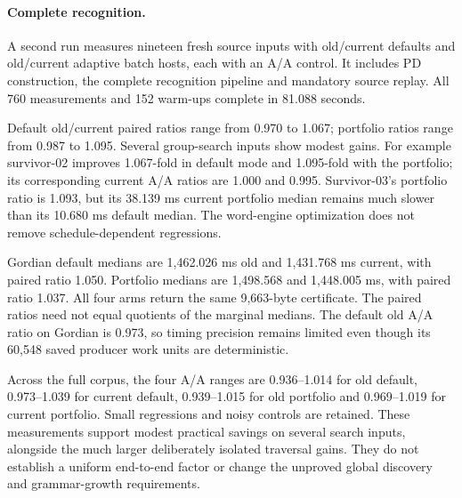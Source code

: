 \paragraph{Complete recognition.}
A second run measures nineteen fresh source inputs with old/current defaults
and old/current adaptive batch hosts, each with an A/A control. It includes
PD construction, the complete recognition pipeline and mandatory source
replay. All 760 measurements and 152 warm-ups complete in 81.088 seconds.



Default old/current paired ratios range from 0.970 to 1.067; portfolio ratios
range from 0.987 to 1.095. Several group-search inputs show modest gains.
For example survivor-02 improves 1.067-fold in default mode and 1.095-fold
with the portfolio; its corresponding current A/A ratios are 1.000 and
0.995. Survivor-03's portfolio ratio is 1.093, but its 38.139 ms current
portfolio median remains much slower than its 10.680 ms default median.
The word-engine optimization does not remove schedule-dependent regressions.

Gordian default medians are 1,462.026 ms old and 1,431.768 ms current, with
paired ratio 1.050. Portfolio medians are 1,498.568 and 1,448.005 ms, with
paired ratio 1.037. All four arms return the same 9,663-byte certificate.
The paired ratios need not equal quotients of the marginal medians.
The default old A/A ratio on Gordian is 0.973, so timing precision remains
limited even though its 60,548 saved producer work units are deterministic.

Across the full corpus, the four A/A ranges are 0.936--1.014 for old default,
0.973--1.039 for current default, 0.939--1.015 for old portfolio and
0.969--1.019 for current portfolio. Small regressions and noisy controls are
retained. These measurements support modest practical savings on several
search inputs, alongside the much larger deliberately isolated traversal
gains. They do not establish a uniform end-to-end factor or change the
unproved global discovery and grammar-growth requirements.
